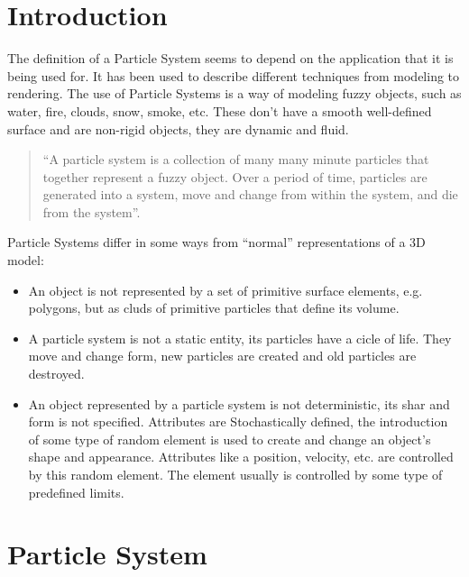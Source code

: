 \section{Introduction}

The definition of a Particle System seems to depend on the application that it is being used for. It has been used to describe different techniques from modeling to rendering. 
The use of Particle Systems is a way of modeling fuzzy objects, such as water, fire, clouds, snow, smoke, etc. These don't have a smooth well-defined surface and are non-rigid objects, they are dynamic and fluid.
\begin{quote}
  ``A particle system is a collection of many many minute particles that together represent a fuzzy object. Over a period of time, particles are generated into a system, move and change from within the system, and die from the system''.
\end{quote}

Particle Systems differ in some ways from ``normal'' representations of a 3D model:
\begin{itemize}
\item An object is not represented by a set of primitive surface elements, e.g. polygons, but as cluds of primitive particles that define its volume. 
\item A particle system is not a static entity, its particles have a cicle of life. They move and change form, new particles are created and old particles are destroyed.
\item An object represented by a particle system is not deterministic, its shar and form is not specified. Attributes are Stochastically defined, the introduction of some type of random element is used to create and change an object's shape and appearance. Attributes like a position, velocity, etc. are controlled by this random element. The element usually is controlled by some type of predefined limits.
\end{itemize}

\section{Particle System}

